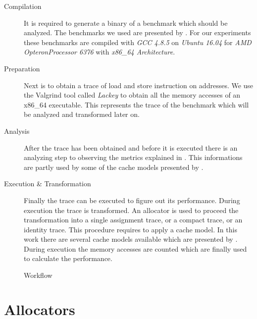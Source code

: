 \documentclass[onecolumn, openright, master, english, signatures]{dbrgrptt}
\begin{document}
\begin{description}
  \item[Compilation] It is required to generate a binary of a benchmark which should be analyzed. The benchmarks we used are presented by . For our experiments these benchmarks are compiled with \emph{GCC 4.8.5} on \emph{Ubuntu 16.04} for \emph{AMD Opteron\texttrademark Processor 6376} with \emph{x86\_64 Architecture}.

  \item[Preparation] Next is to obtain a \ac{trace} of load and store instruction on addresses. We use the Valgrind\cite{Valgrind} tool called \emph{Lackey} to obtain all the memory accesses of an x86\_64 executable. This represents the \ac{trace} of the benchmark which will be analyzed and transformed later on.

  \item[Analysis] After the \ac{trace} has been obtained and before it is executed there is an analyzing step to observing the metrics explained in . This informations are partly used by some of the cache models presented by .

  \item[Execution \& Transformation] Finally the \ac{trace} can be executed to figure out its performance. During execution the \ac{trace} is transformed. An allocator is used to proceed the transformation into a single assignment \ac{trace}, or a compact \ac{trace}, or an identity \ac{trace}. This procedure requires to apply a cache model. In this work there are several cache models available which are presented by . During execution the memory accesses are counted which are finally used to calculate the performance.
\end{description}

\begin{figure}[!ht]
  \centering
  
  \caption{Workflow}
  \label{fig:workflow}
\end{figure}


\section{Allocators}
\label{sec:allocators}
\end{document}
